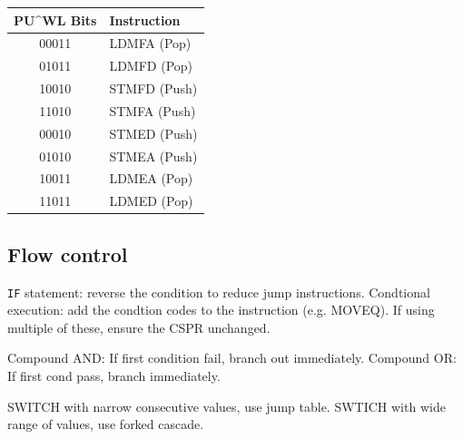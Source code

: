 \documentclass[../comorg-part1.tex]{subfiles}
\begin{document}

\begin{table}[H]
\centering
\begin{tabular}{cl}
\hline
\textbf{PU\^{}WL Bits} & \textbf{Instruction} \\
\hline
00011 & LDMFA (Pop) \\
01011 & LDMFD (Pop) \\
10010 & STMFD (Push) \\
11010 & STMFA (Push) \\
00010 & STMED (Push) \\
01010 & STMEA (Push) \\
10011 & LDMEA (Pop) \\
11011 & LDMED (Pop) \\
\hline
\end{tabular}
\end{table}

\subsection{Flow control}
\texttt{IF} statement: reverse the condition to reduce jump instructions.\newline
Condtional execution: add the condtion codes to the instruction (e.g. MOVEQ). If using multiple of these, ensure the CSPR unchanged.\newline

\smallskip
\noindent Compound AND: If first condition fail, branch out immediately.\newline
Compound OR: If first cond pass, branch immediately.\newline

\smallskip
\noindent SWITCH with narrow consecutive values, use jump table.\newline
SWTICH with wide range of values, use forked cascade.\newline
\end{document}
